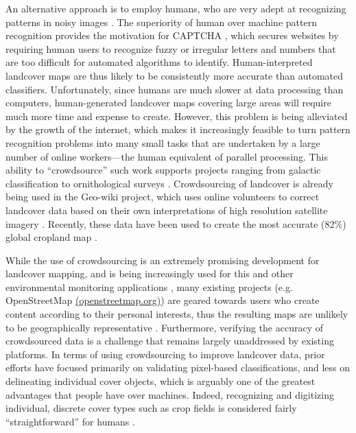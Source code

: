 \documentclass[preprint,12pt,authoryear]{elsarticle}
\begin{document}
An alternative approach is to employ humans, who are very adept at recognizing patterns in noisy images \citep{biederman_recognition-by-components:_1987}. The superiority of human over machine pattern recognition provides the motivation for CAPTCHA \citep{ahn_captcha:_2003}, which secures websites by requiring human users to recognize fuzzy or irregular letters and numbers that are too difficult for automated algorithms to identify. Human-interpreted landcover maps are thus likely to be consistently more accurate than automated classifiers. Unfortunately, since humans are much slower at data processing than computers, human-generated landcover maps covering large areas will require much more time and expense to create. However, this problem is being alleviated by the growth of the internet, which makes it increasingly feasible to turn pattern recognition problems into many small tasks that are undertaken by a large number of online workers---the human equivalent of parallel processing. This ability to ``crowdsource'' \citep{howe_rise_2006} such work supports projects ranging from galactic classification \citep{lintott_galaxy_2008} to ornithological surveys \citep{sullivan_ebird:_2009}. Crowdsourcing of landcover is already being used in the Geo-wiki project, which uses online volunteers to correct landcover data based on their own interpretations of high resolution satellite imagery \citep{fritz_geo-wiki.org:_2009, fritz_geo-wiki:_2012, fritz_mapping_2015}. Recently, these data have been used to create the most accurate (82\%) global cropland map \citep{fritz_cropland_2011, fritz_mapping_2015}.  

While the use of crowdsourcing is an extremely promising development for landcover mapping, and is being increasingly used for this and other environmental monitoring applications \citep{jacobson_novel_2015,fraternali_putting_2012,schellekens_rapid_2014}, many existing projects (e.g. OpenStreetMap \href{openstreetmap.org}{(openstreetmap.org)}) are geared towards users who create content according to their personal interests, thus the resulting maps are unlikely to be geographically representative \citep{fraternali_putting_2012}. Furthermore, verifying the accuracy of crowdsourced data is a challenge \citep{allahbakhsh_quality_2013, flanagin_credibility_2008, see_improved_2015} that remains largely unaddressed by existing platforms. In terms of using crowdsourcing to improve landcover data, prior efforts have focused primarily on validating pixel-based classifications, and less on delineating individual cover objects, which is arguably one of the greatest advantages that people have over machines. Indeed, recognizing and digitizing individual, discrete cover types such as crop fields is considered fairly ``straightforward'' for humans \citep{yan_automated_2014}. 
\end{document}
